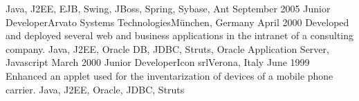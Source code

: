 \begin{experiences}
{  					 }
                    {Java, J2EE, EJB, Swing, JBoss, Spring, Sybase, Ant}
  \emptySeparator
  \consultantexperience
  {September 2005}   {Junior Developer}{Arvato Systems Technologies}{München, Germany}
  {April 2000}       {
                     	  Developed and deployed several web and business applications in the intranet of a consulting company.
                     }
                     {Java, J2EE, Oracle DB, JDBC, Struts, Oracle Application Server, Javascript}
  \emptySeparator
  \consultantexperience
  {March 2000}  	{Junior Developer}{Icon srl}{Verona, Italy}
  {June 1999}   	{ 
  				 		Enhanced an applet used for the inventarization of devices of a mobile phone carrier.
  				 	}
                	{Java, J2EE, Oracle, JDBC, Struts} 
\end{experiences}

